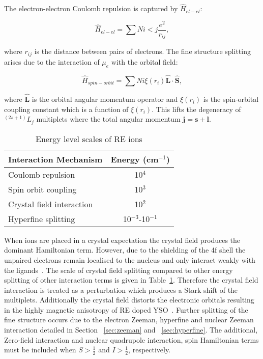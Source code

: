 \noindent The electron-electron Coulomb repulsion is captured by $\hat{H}_{el-el}$:

\begin{equation}
\label{eq:coloumbrep}
\hat{H}_{el-el} = \sum{N}{i<j} \frac{e^{2}}{r_{ij}},
\end{equation}

\noindent where $r_{ij}$ is the distance between pairs of electrons. The fine structure splitting arises due to the interaction of $\mu_{e}$ with the orbital field: 


\begin{equation}
\label{eq:spinorbit}
\hat{H}_{spin-orbit} = \sum{N}{i} \xi(r_{i})\hat{\bm{L}} \cdot \hat{\bm{S}},
\end{equation}

\noindent where $\hat{\bm{L}}$ is the orbital angular momentum operator and $\xi(r_{i})$ is the spin-orbital coupling constant which is a function of $\xi(r_{i})$. This lifts the degeneracy of $^{(2s+1)}L_{j}$ multiplets where the total angular momentum $\bm{j} = \bm{s} + \bm{l}$. 

\begin{table}[h]
 \begin{center}
  \caption{Energy level scales of RE ions}
  \label{tab:REionenergyscale}
  \begin{tabular}{l | c}
  \hline
  Interaction Mechanism & Energy (cm$^{-1}$)\\
  \hline
  Coulomb repulsion & 10$^{4}$\\
  Spin orbit coupling & 10$^{3}$\\
  Crystal field interaction & 10$^{2}$\\
  Hyperfine splitting & 10$^{-3}$-10$^{-1}$\\
  
  \hline
    \end{tabular}
  \end{center}
\end{table}

When ions are placed in a crystal expectation the crystal field produces the dominant Hamiltonian term. However, due to the shielding of the 4f shell the unpaired electrons remain localised to the nucleus and only interact weakly with the ligands~\citep{MALKIN1987131}. The scale of crystal field splitting compared to other energy splitting of other interaction terms is given in Table~\ref{tab:REionenergyscale}. Therefore the crystal field interaction is treated as a perturbation which produces a Stark shift of the multiplets. Additionally the crystal field distorts the electronic orbitals resulting in the highly magnetic anisotropy of RE doped YSO~\citep{abragam2012electron,KOLMAKOVA1996245}. Further splitting of the fine structure occurs due to the electron Zeeman, hyperfine and nuclear Zeeman interaction detailed in Section ~\ref{sec:zeeman} and ~\ref{sec:hyperfine}. The additional, Zero-field interaction and nuclear quadrupole interaction, spin Hamiltonian terms must be included when $S >\frac{1}{2}$ and $I > \frac{1}{2}$, respectively.      

